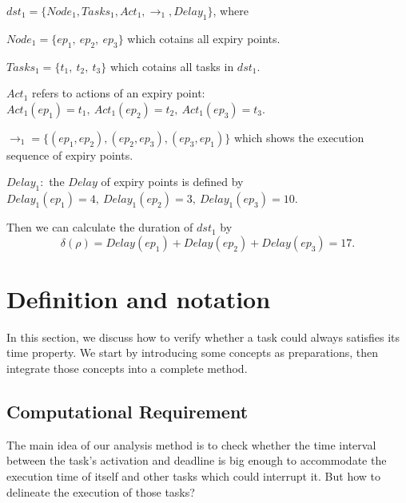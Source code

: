\documentclass[sigconf]{acmart}
\begin{document}
$dst_1=\{Node_1,Tasks_1,Act_1,\rightarrow_1,Delay_1\}$, where 
\begin{compactitem}
\item $Node_1=\{ep_1,\ ep_2,\ ep_3\}$ which cotains all expiry points.
\item $Tasks_1=\{t_1,\ t_2,\ t_3\}$ which cotains all tasks in $dst_1$.
\item $Act_1$ refers to actions of an expiry point:$Act_1(ep_1)=t_1,\ Act_1(ep_2)=t_2,\ Act_1(ep_3)=t_3$.
\item $\rightarrow_1=\{(ep_1,ep_2),(ep_2,ep_3),(ep_3,ep_1)\}$ which shows the execution sequence of expiry points.
\item $Delay_1:$ the $Delay$ of expiry points is defined by $Delay_1(ep_1)=4,\ Delay_1(ep_2)=3,\ Delay_1(ep_3)=10$.
\end{compactitem}

Then we can calculate the duration of $dst_1$ by\[\delta(\rho)=Delay(ep_1)+Delay(ep_2)+Delay(ep_3)=17.\]

\section{Definition and notation}\label{section_definition}
In this section, we discuss how to verify whether a task could always satisfies its time property. We start by introducing some concepts as preparations, then integrate those concepts into a complete method.

\subsection{Computational Requirement}
The main idea of our analysis method is to check whether the time interval between the task's activation and deadline is big enough to accommodate the execution time of itself and other tasks which could interrupt it. But how to delineate the execution of those tasks?
\end{document}
